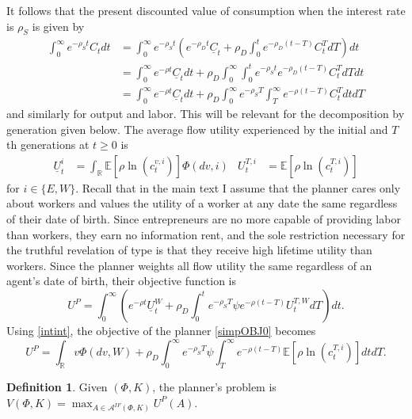 \documentclass[11pt]{article}
\theoremstyle{plain}
\theoremstyle{definition} %
\newtheorem{defn}{Definition}[section]
\begin{document}
It follows that the present discounted value of consumption when the interest rate is $\rho_S$ is given by 
\begin{align*}
\int_0^{\infty} e^{-\rho_St} C_t dt & = \int_0^{\infty} e^{-\rho_St} {\left(e^{- \rho_D t}\underline{C}_t + \rho_D\int_0^te^{-\rho_D(t-T)} C^T_tdT\right)} dt
\\ & = \int_0^{\infty} e^{-\rho t} \underline{C}_t dt + \rho_D \int_0^{\infty} \int_0^t e^{-\rho_St} e^{-\rho_D (t-T)} C^T_tdT dt
\\ & = \int_0^{\infty} e^{-\rho t} \underline{C}_t dt + \rho_D \int_0^{\infty} e^{-\rho_S T} \int_T^{\infty} e^{-\rho (t-T)} C^T_tdtdT
\end{align*}
and similarly for output and labor. This will be relevant for the decomposition by generation given below. The average flow utility experienced by the initial and $T$th generations at $t \geq 0$ is
\begin{align*}
\underline{U}^i_t & = \int_{\mathbb{R}} \mathbb{E} [\rho \ln(c^{v,i}_t)]\Phi(dv, i) &
U^{T,i}_t & = \mathbb{E} [\rho \ln(c^{T,i}_t)]
\end{align*}
for $i \in \{E,W\}$. Recall that in the main text I assume that the planner cares only about workers and values the utility of a worker at any date the same regardless of their date of birth. Since entrepreneurs are no more capable of providing labor than workers, they earn no information rent, and the sole restriction necessary for the truthful revelation of type is that they receive high lifetime utility than workers. Since the planner weights all flow utility the same regardless of an agent's date of birth, their objective function is
\begin{equation}
U^P = \int_0^{\infty}{\left(e^{-\rho t}\underline{U}^W_t + \rho_D \int_0^te^{-\rho_S T}\psi e^{-\rho  (t-T)} U^{T,W}_tdT\right)}dt.
\label{simpOBJ0}
\end{equation}
Using \eqref{intint}, the objective of the planner \eqref{simpOBJ0} becomes 
\begin{equation} %
U^P = \int_{\mathbb{R}} v\Phi(dv,W) + \rho_D\int_0^{\infty}e^{-\rho_ST} \psi \int_T^{\infty}e^{-\rho (t-T)} \mathbb{E} [\rho \ln(c^{T,i}_t)]dt dT.
\label{simpOBJ}
\end{equation}


\begin{defn}\label{planprob}
Given $(\Phi, K)$, the planner's problem is $V(\Phi,K) = \max_{A \in \mathcal{A}^{IF}(\Phi,K)} U^P(A)$.
\end{defn}
\end{document}

